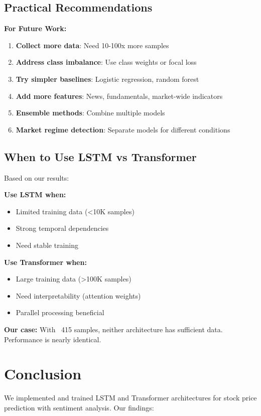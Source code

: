 \documentclass[10pt,twocolumn]{article}
\begin{document}
\subsection{Practical Recommendations}

\textbf{For Future Work:}
\begin{enumerate}
\item \textbf{Collect more data}: Need 10-100x more samples
\item \textbf{Address class imbalance}: Use class weights or focal loss
\item \textbf{Try simpler baselines}: Logistic regression, random forest
\item \textbf{Add more features}: News, fundamentals, market-wide indicators
\item \textbf{Ensemble methods}: Combine multiple models
\item \textbf{Market regime detection}: Separate models for different conditions
\end{enumerate}

\subsection{When to Use LSTM vs Transformer}

Based on our results:

\textbf{Use LSTM when:}
\begin{itemize}
\item Limited training data (<10K samples)
\item Strong temporal dependencies
\item Need stable training
\end{itemize}

\textbf{Use Transformer when:}
\begin{itemize}
\item Large training data (>100K samples)
\item Need interpretability (attention weights)
\item Parallel processing beneficial
\end{itemize}

\textbf{Our case:} With ~415 samples, neither architecture has sufficient data. Performance is nearly identical.

\section{Conclusion}

We implemented and trained LSTM and Transformer architectures for stock price prediction with sentiment analysis. Our findings:
\end{document}
